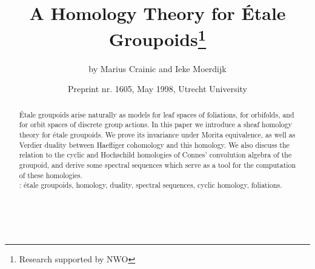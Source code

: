 \documentclass[a4paper]{article}
\begin{document}
\title{A Homology Theory for \'Etale Groupoids\thanks{Research supported by NWO}}
\author { by Marius Crainic and Ieke Moerdijk}
\date{Preprint nr. 1605, May 1998, Utrecht University}
\pagestyle{myheadings}
\maketitle
\begin{abstract}
\'Etale groupoids arise naturally as models for leaf spaces of foliations, for orbifolds, and for orbit spaces of discrete group actions. In this paper we introduce a sheaf homology theory for \'etale groupoids. We prove its invariance under Morita equivalence, as well as Verdier duality between Haefliger cohomology and this homology. We also discuss the relation to the cyclic and Hochschild homologies of Connes' convolution algebra of the groupoid, and derive some spectral sequences which serve as a tool for the computation of these homologies.\\
\newline 
\hspace*{.2in}{\bf Keywords}: \'etale groupoids, homology, duality, spectral sequences, cyclic homology,   \linebreak foliations.
\end{abstract}



\hspace*{2.5in}{\bf Introduction}\\
\end{document}
